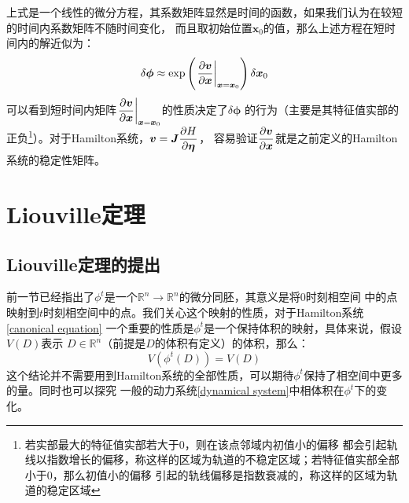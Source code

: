     上式是一个线性的微分方程，其系数矩阵显然是时间的函数，如果我们认为在较短的时间内系数矩阵不随时间变化，
    而且取初始位置$\bm{x}_0$的值，那么上述方程在短时间内的解近似为：
    \begin{equation}
        \delta \bm{\phi} \approx \exp\left(\left.\frac{\partial{\bm{v}}}{\partial{\bm{x}}}\right|_{\bm{x} = \bm{x}_0}\right) \delta\bm{x}_0
    \end{equation}
    可以看到短时间内矩阵$\displaystyle\left.\frac{\partial{\bm{v}}}{\partial{\bm{x}}}\right|_{\bm{x} = \bm{x}_0}$的性质决定了$\delta\bm{\phi}$
    的行为（主要是其特征值实部的正负\footnote{若实部最大的特征值实部若大于0，则在该点邻域内初值小的偏移
    都会引起轨线以指数增长的偏移，称这样的区域为轨道的不稳定区域；若特征值实部全部小于0，那么初值小的偏移
    引起的轨线偏移是指数衰减的，称这样的区域为轨道的稳定区域}）。对于Hamilton系统，$\displaystyle\bm{v} = \bm{J}\frac{\partial{H}}{\partial{\bm{\eta}}}$，
    容易验证$\displaystyle\frac{\partial{\bm{v}}}{\partial{\bm{x}}}$就是之前定义的Hamilton系统的稳定性矩阵。
    \section{Liouville定理}
    \subsection{Liouville定理的提出}
    前一节已经指出了$\phi^t$是一个$\mathbb{R}^n\to\mathbb{R}^n$的微分同胚，其意义是将0时刻相空间
    中的点映射到$t$时刻相空间中的点。我们关心这个映射的性质，对于Hamilton系统\ref{canonical equation}
    一个重要的性质是$\phi^t$是一个保持体积的映射，具体来说，假设$V(D)$表示
    $D\in\mathbb{R}^n$（前提是$D$的体积有定义）的体积，那么：
    \begin{equation}
        V(\phi^t(D)) = V(D)
    \end{equation}
    这个结论并不需要用到Hamilton系统的全部性质，可以期待$\phi^t$保持了相空间中更多的量。同时也可以探究
    一般的动力系统\ref{dynamical system}中相体积在$\phi^t$下的变化。
